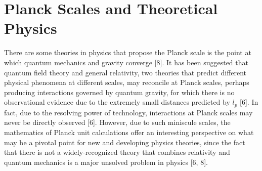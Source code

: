 \documentclass[paper=a4, fontsize=12pt]{scrartcl} %
\numberwithin{equation}{section} %
\numberwithin{figure}{section} %
\numberwithin{table}{section} %
\begin{document}
\section{Planck Scales and Theoretical Physics}

There are some theories in physics that propose the Planck scale is the point at which quantum mechanics and gravity converge [8]. It has been suggested that quantum field theory and general relativity, two theories that predict different physical phenomena at different scales, may reconcile at Planck scales, perhaps producing interactions governed by quantum gravity, for which there is no observational evidence due to the extremely small distances predicted by $l_p$ [6]. In fact, due to the resolving power of technology, interactions at Planck scales may never be directly observed [6]. However, due to such miniscule scales, the mathematics of Planck unit calculations offer an interesting perspective on what may be a pivotal point for new and developing physics theories, since the fact that there is not a widely-recognized theory that combines relativity and quantum mechanics is a major unsolved problem in physics [6, 8].
\end{document}
